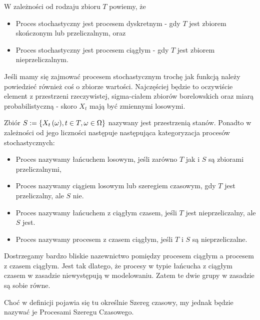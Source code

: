 \documentclass[10pt,a4paper]{book}
\begin{document}
\begin{definition}
W zależności od rodzaju zbioru $T$ powiemy, że
\begin{itemize}
\item Proces stochastyczny jest procesem dyskretnym - gdy $T$ jest zbiorem skończonym lub przeliczalnym, oraz
\item Proces stochastyczny jest procesem ciągłym - gdy $T$ jest zbiorem nieprzeliczalnym.
\end{itemize}
\end{definition}

Jeśli mamy się zajmować procesem stochastycznym trochę jak funkcją należy powiedzieć również coś o zbiorze wartości. Najczęściej będzie to oczywiście element z przestrzeni rzeczywistej, sigma-ciałem zbiorów borelowskich oraz miarą probabilistyczną - skoro $X_t$ mają być zmiennymi losowymi.

\begin{definition}
Zbiór $S := \left\lbrace { {{X_t}\left( {\omega} \right)}, t \in T, \omega \in \Omega } \right\rbrace$ nazywany jest przestrzenią stanów. Ponadto w zależności od jego liczności następuje następująca kategoryzacja procesów stochastycznych:
\begin{itemize}
\item Proces nazywamy łańcuchem losowym, jeśli zarówno $T$ jak i $S$ są zbiorami przeliczalnymi,
\item Proces nazywamy ciągiem losowym lub szeregiem czasowym, gdy $T$ jest przeliczalny, ale $S$ nie.
\item Proces nazywamy łańcuchem z ciągłym czasem, jeśli $T$ jest nieprzeliczalny, ale $S$ jest.
\item Proces nazywamy procesem z czasem ciągłym, jeśli $T$ i $S$ są nieprzeliczalne.
\end{itemize}

\end{definition}

\begin{remark*}
Dostrzegamy bardzo bliskie nazewnictwo pomiędzy procesem ciągłym a procesem z czasem ciągłym. Jest tak dlatego, że procesy w typie łańcucha z ciągłym czasem w zasadzie niewystępują w modelowaniu. Zatem te dwie grupy w zasadzie są sobie równe.
\end{remark*}

\begin{remark*}
Choć w definicji pojawia się tu określnie Szereg czasowy, my jednak będzie nazywać je Procesami Szeregu Czasowego.
\end{remark*}
\end{document}
